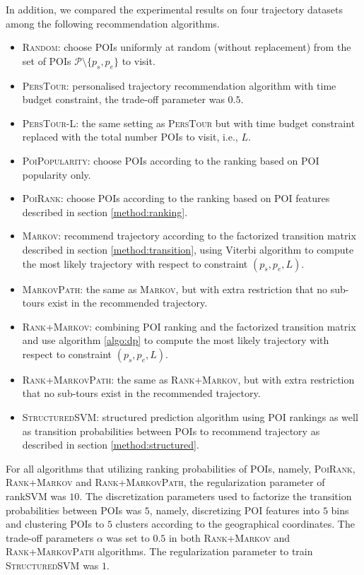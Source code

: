 In addition, we compared the experimental results on four trajectory datasets among 
the following recommendation algorithms.
\begin{itemize}
\item \textsc{Random}: choose POIs uniformly at random (without replacement) 
      from the set of POIs $\mathcal{P} \setminus \{p_s, p_e \}$ to visit.
\item \textsc{PersTour}\cite{ijcai15}: personalised trajectory recommendation algorithm with time budget constraint,
      the trade-off parameter was $0.5$.
\item \textsc{PersTour-L}: the same setting as \textsc{PersTour} but with time budget constraint replaced with the 
      total number POIs to visit, i.e., $L$.
\item \textsc{PoiPopularity}: choose POIs according to the ranking based on POI popularity only.
\item \textsc{PoiRank}: choose POIs according to the ranking based on POI features described in section \ref{method:ranking}.
\item \textsc{Markov}: recommend trajectory according to the factorized transition matrix described in section \ref{method:transition},
      using Viterbi algorithm to compute the most likely trajectory with respect to constraint $(p_s, p_e, L)$.
\item \textsc{MarkovPath}: the same as \textsc{Markov}, but with extra restriction that 
      no sub-tours exist in the recommended trajectory.
\item \textsc{Rank+Markov}: combining POI ranking and the factorized transition matrix and use algorithm \ref{algo:dp} to 
      compute the most likely trajectory with respect to constraint $(p_s, p_e, L)$.
\item \textsc{Rank+MarkovPath}: the same as \textsc{Rank+Markov}, but with extra restriction that 
      no sub-tours exist in the recommended trajectory.
\item \textsc{StructuredSVM}: structured prediction algorithm using POI rankings as well as transition probabilities
      between POIs to recommend trajectory as described in section \ref{method:structured}.
\end{itemize}

For all algorithms that utilizing ranking probabilities of POIs, namely, \textsc{PoiRank}, \textsc{Rank+Markov} and 
\textsc{Rank+MarkovPath}, the regularization parameter of rankSVM was $10$.
The discretization parameters used to factorize the transition probabilities between POIs was $5$, namely,
discretizing POI features into $5$ bins and clustering POIs to $5$ clusters according to the geographical coordinates.
The trade-off parameters $\alpha$ was set to $0.5$ in both \textsc{Rank+Markov} and \textsc{Rank+MarkovPath} algorithms.
The regularization parameter to train \textsc{StructuredSVM} was $1$.


